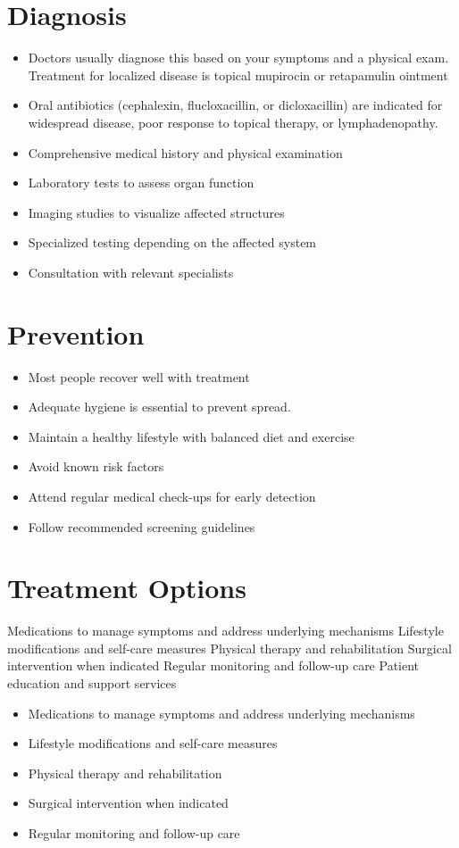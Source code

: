 \section{Diagnosis}
\begin{itemize}[noitemsep]
  \item Doctors usually diagnose this based on your symptoms and a physical exam. Treatment for localized disease is topical mupirocin or retapamulin ointment
  \item Oral antibiotics (cephalexin, flucloxacillin, or dicloxacillin) are indicated for widespread disease, poor response to topical therapy, or lymphadenopathy.
  \item Comprehensive medical history and physical examination
  \item Laboratory tests to assess organ function
  \item Imaging studies to visualize affected structures
  \item Specialized testing depending on the affected system
  \item Consultation with relevant specialists
\end{itemize}
\section{Prevention}
\begin{itemize}[noitemsep]
  \item Most people recover well with treatment
  \item Adequate hygiene is essential to prevent spread.
  \item Maintain a healthy lifestyle with balanced diet and exercise
  \item Avoid known risk factors
  \item Attend regular medical check-ups for early detection
  \item Follow recommended screening guidelines
\end{itemize}
\section{Treatment Options}
Medications to manage symptoms and address underlying mechanisms Lifestyle modifications and self-care measures Physical therapy and rehabilitation Surgical intervention when indicated Regular monitoring and follow-up care Patient education and support services

\begin{itemize}[noitemsep]
  \item Medications to manage symptoms and address underlying mechanisms
  \item Lifestyle modifications and self-care measures
  \item Physical therapy and rehabilitation
  \item Surgical intervention when indicated
  \item Regular monitoring and follow-up care
\end{itemize}
